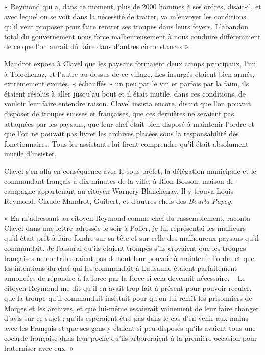 \documentclass[french,twoside]{book} %
\newenvironment{quoteblock}%
  {\begin{quoting}}
  {\end{quoting}}
\newenvironment{quotebar}{%
    \def\FrameCommand{{\color{rubric!10!}\vrule width 0.5em} \hspace{0.9em}}%
    \def\OuterFrameSep{\itemsep} %
    \MakeFramed {\advance\hsize-\width \FrameRestore}
  }%
  {%
    \endMakeFramed
  }
\renewenvironment{quoteblock}%
  {%
    \savenotes
    \setstretch{0.9}
    \begin{quotebar}
  }
  {%
    \end{quotebar}
    \spewnotes
  }
\begin{document}
\begin{quoteblock}
 \noindent « Reymond qui a, dans ce moment, plus de 2000 hommes à ses ordres, disait-il, et avec lequel on se voit dans la nécessité de traiter, va m’envoyer les conditions qu’il veut proposer pour faire rentrer ses troupes dans leurs foyers. L’abandon total du gouvernement nous force malheureusement à nous conduire différemment de ce que l’on aurait dû faire dans d’autres circonstances ».
 \end{quoteblock}

\noindent Mandrot exposa à Clavel que les paysans formaient deux camps principaux, l’un à Tolochenaz, et l’autre au-dessus de ce village. Les insurgés étaient bien armés, extrêmement excités, « échauffés » un peu par le vin et parfois par la faim, ils étaient résolus à aller jusqu’au bout et il était inutile, dans ces conditions, de vouloir leur faire entendre raison. Clavel insista encore, disant que l’on pouvait disposer de troupes suisses et françaises, que ces dernières ne seraient pas attaquées par les paysans, que leur chef était bien disposé à maintenir l’ordre et que l’on ne pouvait pas livrer les archives placées sous la responsabilité des fonctionnaires. Tous les assistants lui firent comprendre qu’il était absolument inutile d’insister.\par
Clavel s’en alla en conséquence avec le sous-préfet, la délégation municipale et le commandant français à dix minutes de la ville, à Rion-Bosson, maison de campagne appartenant au citoyen Warnery-Blanchenay. Il y trouva Louis Reymond, Claude Mandrot, Guibert, et d’autres chefs des \emph{Bourla-Papey.}\par

\begin{quoteblock}
 \noindent « En m’adressant au citoyen Reymond comme chef du rassemblement, raconta Clavel dans une lettre adressée le soir à Polier, je lui représentai les malheurs qu’il était prêt à faire fondre sur sa tête et sur celle des malheureux paysans qu’il commandait. Je l’assurai qu’ils étaient trompés s’ils croyaient que les troupes françaises ne contribueraient pas de tout leur pouvoir à maintenir l’ordre et que les intentions du chef qui les commandait à Lausanne étaient parfaitement annoncées de répondre à la force par la force si cela devenait nécessaire. – Le citoyen Reymond me dit qu’il en avait trop fait à présent pour pouvoir reculer, que la troupe qu’il commandait insistait pour qu’on lui remît les prisonniers de Morges et les archives, et que lui-même essaierait vainement de leur faire changer d’avis sur ce sujet ; qu’ils espéraient être pas dans le cas d’en venir aux mains avec les Français et que ses gens y étaient si peu disposés qu’ils avaient tous une cocarde française dans leur poche qu’ils arboreraient à la première occasion pour fraterniser avec eux. »
 \end{quoteblock}
\end{document}
